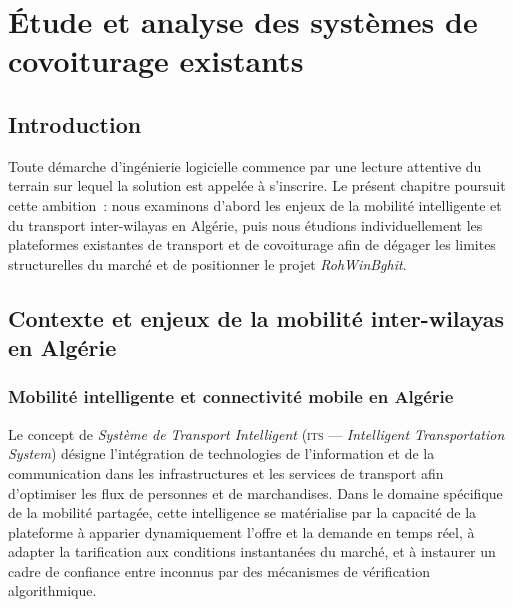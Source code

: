\chapter{Étude et analyse des systèmes de covoiturage existants}
\label{chap:etat-art}

\section{Introduction}

Toute démarche d'ingénierie logicielle commence par une lecture attentive du terrain sur lequel la solution est appelée à s'inscrire. Le présent chapitre poursuit cette ambition~: nous examinons d'abord les enjeux de la mobilité intelligente et du transport inter-wilayas en Algérie, puis nous étudions individuellement les plateformes existantes de transport et de covoiturage afin de dégager les limites structurelles du marché et de positionner le projet \textit{RohWinBghit}.

\section{Contexte et enjeux de la mobilité inter-wilayas en Algérie}
\label{sec:presentation-domaine}

\subsection{Mobilité intelligente et connectivité mobile en Algérie}
\label{sec:mobilite-intelligente}

Le concept de \textit{Système de Transport Intelligent} (\textsc{its} --- \textit{Intelligent Transportation System}) désigne l'intégration de technologies de l'information et de la communication dans les infrastructures et les services de transport afin d'optimiser les flux de personnes et de marchandises. Dans le domaine spécifique de la mobilité partagée, cette intelligence se matérialise par la capacité de la plateforme à apparier dynamiquement l'offre et la demande en temps réel, à adapter la tarification aux conditions instantanées du marché, et à instaurer un cadre de confiance entre inconnus par des mécanismes de vérification algorithmique.

